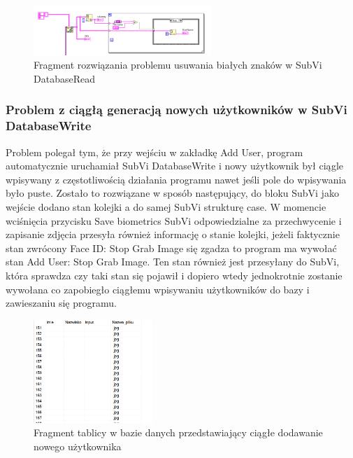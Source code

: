 \documentclass{report}
\begin{document}
\begin{figure}[H]
    \centering
    \includegraphics[width=0.6\textwidth]{src/Database/Fragment_DatabaseRead.png}
    \caption{Fragment rozwiązania problemu usuwania białych znaków w SubVi DatabaseRead}
    \label{fig:tab-control-page}
\end{figure}

\subsubsection{\large Problem z ciągłą generacją nowych użytkowników w SubVi DatabaseWrite}

Problem polegał tym, że przy wejściu w zakładkę Add User, program automatycznie uruchamiał SubVi DatabaseWrite i nowy użytkownik był ciągle wpisywany z częstotliwością działania programu nawet jeśli pole do wpisywania
było puste. Zostało to rozwiązane w sposób następujący, do bloku SubVi jako wejście dodano stan kolejki a do samej SubVi strukturę case. W momencie wciśnięcia przycisku Save biometrics
SubVi odpowiedzialne za przechwycenie i zapisanie zdjęcia przesyła również informację o stanie kolejki, jeżeli faktycznie stan zwrócony Face ID: Stop Grab Image się zgadza to program ma wywołać stan 
Add User: Stop Grab Image. Ten stan również jest przesyłany do SubVi, która sprawdza czy taki stan się pojawił i dopiero wtedy jednokrotnie zostanie wywołana co zapobiegło ciągłemu wpisywaniu użytkowników
do bazy i zawieszaniu się programu.

\begin{figure}[H]
    \centering
    \includegraphics[width=0.4\textwidth]{src/Database/Write_spam.png}
    \caption{Fragment tablicy w bazie danych przedstawiający ciągłe dodawanie nowego użytkownika}
    \label{fig:tab-control-page}
\end{figure}
\end{document}
